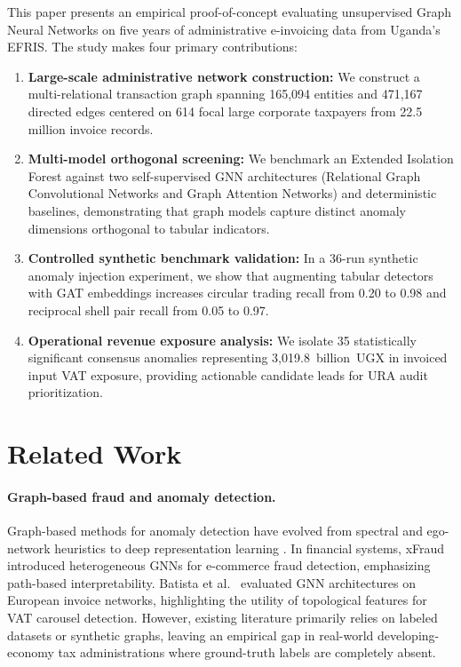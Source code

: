 \documentclass[10pt,twocolumn]{article}
\begin{document}
This paper presents an empirical proof-of-concept evaluating unsupervised Graph Neural Networks on five years of administrative e-invoicing data from Uganda's EFRIS. The study makes four primary contributions:
\begin{enumerate}
  \item \textbf{Large-scale administrative network construction:} We construct a multi-relational transaction graph spanning 165,094 entities and 471,167 directed edges centered on 614 focal large corporate taxpayers from 22.5 million invoice records.
  \item \textbf{Multi-model orthogonal screening:} We benchmark an Extended Isolation Forest against two self-supervised GNN architectures (Relational Graph Convolutional Networks and Graph Attention Networks) and deterministic baselines, demonstrating that graph models capture distinct anomaly dimensions orthogonal to tabular indicators.
  \item \textbf{Controlled synthetic benchmark validation:} In a 36-run synthetic anomaly injection experiment, we show that augmenting tabular detectors with GAT embeddings increases circular trading recall from 0.20 to 0.98 and reciprocal shell pair recall from 0.05 to 0.97.
  \item \textbf{Operational revenue exposure analysis:} We isolate 35 statistically significant consensus anomalies representing 3,019.8~billion~UGX in invoiced input VAT exposure, providing actionable candidate leads for URA audit prioritization.
\end{enumerate}

\section{Related Work}
\label{sec:related}

\paragraph{Graph-based fraud and anomaly detection.}
Graph-based methods for anomaly detection have evolved from spectral and ego-network heuristics \cite{akoglu2015graph} to deep representation learning \cite{scarselli2009gnn}. In financial systems, xFraud \cite{rao2021xfraud} introduced heterogeneous GNNs for e-commerce fraud detection, emphasizing path-based interpretability. Batista et al.~\cite{batista2023detecting} evaluated GNN architectures on European invoice networks, highlighting the utility of topological features for VAT carousel detection. However, existing literature primarily relies on labeled datasets or synthetic graphs, leaving an empirical gap in real-world developing-economy tax administrations where ground-truth labels are completely absent.
\end{document}
